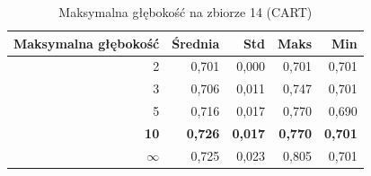 \begin{table}[htbp]
\centering
\small
\setlength{\tabcolsep}{6pt}
\renewcommand{\arraystretch}{1.2}
\caption{Maksymalna głębokość na zbiorze 14 (CART)}
\label{tab:CART_max_depth_14}
\begin{tabular}{r|r|r|r|r}
\toprule
Maksymalna głębokość & Średnia & Std & Maks & Min \\
\hline
2 & 0,701 & 0,000 & 0,701 & 0,701 \\
3 & 0,706 & 0,011 & 0,747 & 0,701 \\
5 & 0,716 & 0,017 & 0,770 & 0,690 \\
\textbf{10} & \textbf{0,726} & \textbf{0,017} & \textbf{0,770} & \textbf{0,701} \\
$\infty$ & 0,725 & 0,023 & 0,805 & 0,701 \\
\bottomrule
\end{tabular}
\end{table}